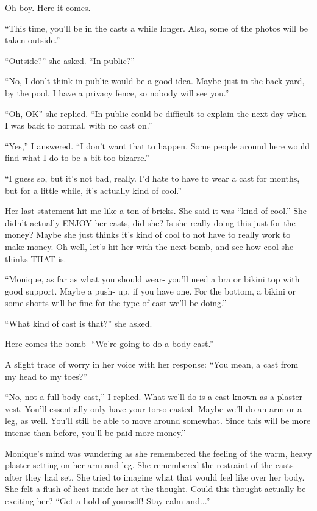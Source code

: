 \begin{thought}
Oh boy. Here it comes.
\end{thought}

``This time, you'll be in the casts a while longer. Also, some of the photos will be taken
outside.''

``Outside?'' she asked. ``In public?''

``No, I don't think in public would be a good idea. Maybe just in the back yard, by the pool.
I have a privacy fence, so nobody will see you.''

``Oh, OK'' she replied. ``In public could be difficult to explain the next day when I was back
to normal, with no cast on.''

``Yes,'' I answered. ``I don't want that to happen. Some people around here would find what I
do to be a bit too bizarre.''

``I guess so, but it's not bad, really. I'd hate to have to wear a cast for months, but for a
little while, it's actually kind of cool.''

Her last statement hit me like a ton of bricks. She said it was ``kind of cool.'' She didn't
actually ENJOY her casts, did she? Is she really doing this just for the money? Maybe she just
thinks it's kind of cool to not have to really work to make money. Oh well, let's hit her with
the next bomb, and see how cool she thinks THAT is.

``Monique, as far as what you should wear- you'll need a bra or bikini top with good support.
Maybe a push- up, if you have one. For the bottom, a bikini or some shorts will be fine for the
type of cast we'll be doing.''

``What kind of cast is that?'' she asked.

Here comes the bomb- ``We're going to do a body cast.''

A slight trace of worry in her voice with her response: ``You mean, a cast from my head to my
toes?''

``No, not a full body cast,'' I replied. What we'll do is a cast known as a plaster vest.
You'll essentially only have your torso casted. Maybe we'll do an arm or a leg, as well. You'll
still be able to move around somewhat. Since this will be more intense than before, you'll be
paid more money.''

\begin{thought}
Monique's mind was wandering as she remembered the feeling of the warm, heavy plaster
setting on her arm and leg. She remembered the restraint of the casts after they had set. She
tried to imagine what that would feel like over her body. She felt a flush of heat inside her at
the thought. Could this thought actually be exciting her? ``Get a hold of yourself! Stay calm
and...''
\end{thought}

